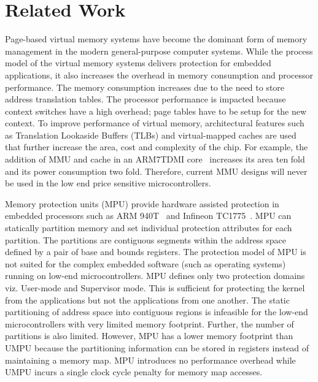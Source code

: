\section{Related Work}
\label{sec:related}
%
Page-based virtual memory systems have become the dominant form of
memory management in the modern general-purpose computer systems.
%
While the process model of the virtual memory systems delivers protection for embedded applications, it also increases the overhead in memory consumption and processor performance.
%
The memory consumption increases due to the need to store address translation tables.
%
The processor performance is impacted because context switches have a high overhead; page tables have to be setup for the new context.
%
To improve performance of virtual memory, architectural features such as Translation Lookaside Buffers (TLBs) and virtual-mapped caches are used that further increase the area, cost and complexity of the chip.
%
For example, the addition of MMU and cache in an ARM7TDMI core~\cite{arm7tdmi} increases its area ten fold and its power consumption two fold. 
%
Therefore, current MMU designs will never be used in the low end price sensitive microcontrollers.

%
Memory protection units (MPU) provide hardware assisted protection in  embedded processors such as ARM
940T~\cite{arm940tds} and Infineon TC1775~\cite{inftc1775ds}.
%
MPU can statically partition memory and set individual protection attributes for each partition.
%
The partitions are contiguous segments within the address space defined by a pair of base and bounds registers.
%
The protection model of MPU is not suited for the complex embedded
software (such as operating systems) running on low-end microcontrollers.
%
MPU defines only two protection domains viz. User-mode and Supervisor
mode.
%
This is sufficient for protecting the kernel from the applications but
not the applications from one another.
%
The static partitioning of address space into contiguous regions is
infeasible for the low-end microcontrollers with very limited memory
footprint.
%
Further, the number of partitions is also limited.
%
However, MPU has a lower memory footprint than UMPU because the
partitioning information can be stored in registers instead of
maintaining a memory map.
%
MPU introduces no performance overhead while UMPU incurs a single
clock cycle penalty for memory map accesses.
%


